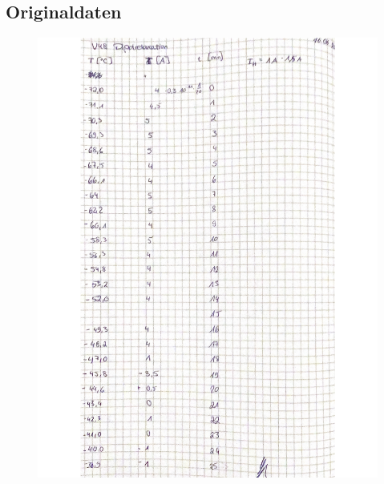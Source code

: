 \subsection{Originaldaten}
 \begin{figure}[H]
   \centering
   \includegraphics[width=\textwidth]{Bilder/Daten1.pdf}
   \label{fig:Messungen_1}
 \end{figure}
